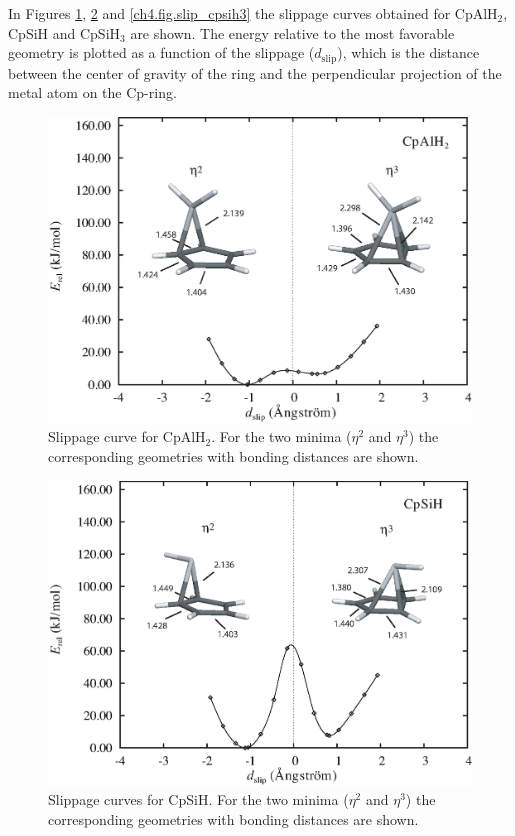 In Figures \ref{ch4.fig.slip_cpalh2}, \ref{ch4.fig.slip_cpsih} and \ref{ch4.fig.slip_cpsih3} the slippage curves obtained for CpAlH$_2$, CpSiH and CpSiH$_3$ are shown. The energy relative to the most favorable geometry is plotted as a function of  the slippage ($d_\mathrm{slip}$), which is the distance between the center of gravity of the ring and the  perpendicular projection of the metal atom on the Cp-ring.
\begin{figure}[hbtp]
\center
\includegraphics[scale=0.80]{cyclopentadienyl/figures/cpalh2.eps}
\caption{Slippage curve for CpAlH$_2$. For the two minima ($\eta^2$ and $\eta^3$) the corresponding geometries with bonding distances are shown.}
\label{ch4.fig.slip_cpalh2}
\end{figure}
\begin{figure}[htbp]
\center
\includegraphics[scale=0.80]{cyclopentadienyl/figures/cpsih.eps}
\caption{Slippage curves for CpSiH. For the two minima ($\eta^2$ and $\eta^3$) the corresponding geometries with bonding distances are shown.}
\label{ch4.fig.slip_cpsih}
\end{figure}
